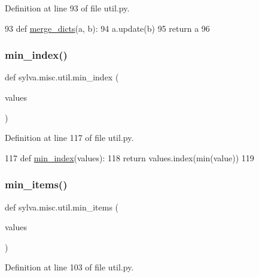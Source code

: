 Definition at line 93 of file util.\+py.


\begin{DoxyCode}
93 \textcolor{keyword}{def }\hyperlink{namespacesylva_1_1misc_1_1util_a5cd57a1d193048a940df5f3795423f8c}{merge\_dicts}(a, b):
94     a.update(b)
95     \textcolor{keywordflow}{return} a
96 
\end{DoxyCode}
\mbox{\label{namespacesylva_1_1misc_1_1util_a167f655cf126d75c98e671a0672087ca}} 
\subsubsection{\texorpdfstring{min\+\_\+index()}{min\_index()}}
{\footnotesize\ttfamily def sylva.\+misc.\+util.\+min\+\_\+index (\begin{DoxyParamCaption}\item[{}]{values }\end{DoxyParamCaption})}



Definition at line 117 of file util.\+py.


\begin{DoxyCode}
117 \textcolor{keyword}{def }\hyperlink{namespacesylva_1_1misc_1_1util_a167f655cf126d75c98e671a0672087ca}{min\_index}(values):
118     \textcolor{keywordflow}{return} values.index(min(value))
119 
\end{DoxyCode}
\mbox{\label{namespacesylva_1_1misc_1_1util_a7fdf694403cc19390b498aa430354a22}} 
\subsubsection{\texorpdfstring{min\+\_\+items()}{min\_items()}}
{\footnotesize\ttfamily def sylva.\+misc.\+util.\+min\+\_\+items (\begin{DoxyParamCaption}\item[{}]{values }\end{DoxyParamCaption})}



Definition at line 103 of file util.\+py.


